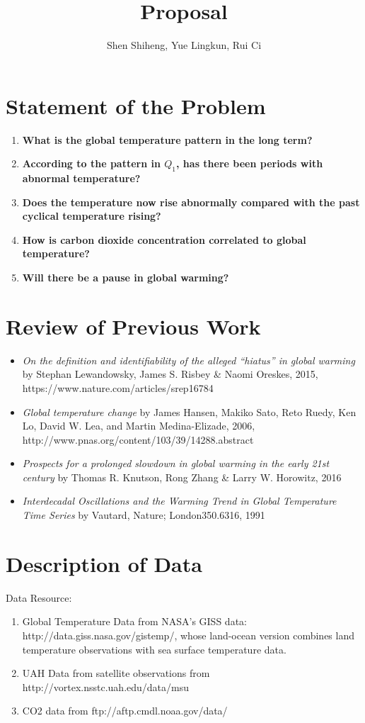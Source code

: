 \documentclass[11pt,a4paper]{article}
\author{Shen Shiheng, Yue Lingkun, Rui Ci}
\title{\textbf{Proposal}}
\begin{document}
\maketitle

\section{Statement of the Problem}
\begin{enumerate}
	\item \textbf{What is the global temperature pattern in the long term?}
	\item \textbf{According to the pattern in $Q_1$, has there been periods with abnormal temperature?}
	\item \textbf{Does the temperature now rise abnormally compared with the past cyclical temperature rising?}  
	\item \textbf{How is carbon dioxide concentration correlated to global temperature?} 
	\item \textbf{Will there be a pause in global warming?} 
\end{enumerate}

\section{Review of Previous Work}
\begin{itemize}
	\item \textit{On the definition and identifiability of the alleged “hiatus” in global warming} by Stephan Lewandowsky, James S. Risbey \& Naomi Oreskes, 2015, https://www.nature.com/articles/srep16784 
	\item \textit{Global temperature change} by James Hansen, Makiko Sato, Reto Ruedy, Ken Lo, David W. Lea, and Martin Medina-Elizade, 2006, http://www.pnas.org/content/103/39/14288.abstract 
	\item \textit{Prospects for a prolonged slowdown in global warming in the early 21st century} by Thomas R. Knutson, Rong Zhang \& Larry W. Horowitz, 2016
	\item \textit{Interdecadal Oscillations and the Warming Trend in Global Temperature Time Series} by Vautard, Nature; London350.6316, 1991 
\end{itemize}


\section{Description of Data}
Data Resource:
\begin{enumerate}
	\item Global Temperature Data from NASA’s GISS data: http://data.giss.nasa.gov/gistemp/, whose land-ocean version combines land temperature observations with sea surface temperature data.
	\item UAH Data from satellite observations from http://vortex.nsstc.uah.edu/data/msu
 	\item CO2 data from ftp://aftp.cmdl.noaa.gov/data/
\end{enumerate}
\end{document}

